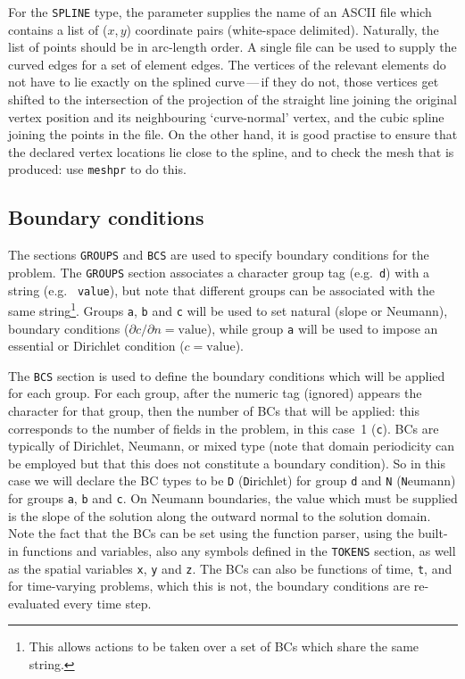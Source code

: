 \documentclass[11pt]{report}
\newcommand{\eg}{e.g.\ } \newcommand{\CC}{\mathrm{c.c.}}
\begin{document}
For the \texttt{SPLINE} type, the parameter supplies the name of an
ASCII file which contains a list of ($x$,\,$y$) coordinate pairs
(white-space delimited). Naturally, the list of points should be in
arc-length order. A single file can be used to supply the curved edges
for a set of element edges. The vertices of the relevant elements do
not have to lie exactly on the splined curve\,---\,if they do not,
those vertices get shifted to the intersection of the projection of
the straight line joining the original vertex position and its
neighbouring `curve-normal' vertex, and the cubic spline joining the
points in the file. On the other hand, it is good practise to ensure
that the declared vertex locations lie close to the spline, and to
check the mesh that is produced: use \texttt{meshpr} to do this.

\subsection{Boundary conditions}

The sections \texttt{GROUPS} and \texttt{BCS} are used to specify
boundary conditions for the problem.  The \texttt{GROUPS} section
associates a character group tag (\eg \verb+d+) with a string (\eg
\verb+value+), but note that different groups can be associated with
the same string\footnote{This allows actions to be taken over a set of
  BCs which share the same string.}.  Groups \verb+a+, \verb+b+ and
\verb+c+ will be used to set natural (\ie slope or Neumann), boundary
conditions ($\partial c/\partial n=\textrm{value}$), while group
\verb+a+ will be used to impose an essential or Dirichlet condition
($c=\textrm{value}$).

The \texttt{BCS} section is used to define the boundary conditions
which will be applied for each group.  For each group, after the
numeric tag (ignored) appears the character for that group, then the
number of BCs that will be applied: this corresponds to the number of
fields in the problem, in this case~1 (\verb+c+).  BCs are typically
of Dirichlet, Neumann, or mixed type (note that domain periodicity can
be employed but that this does not constitute a boundary condition).
So in this case we will declare the BC types to be \verb+D+ ({\texttt
  D}irichlet) for group \verb+d+ and \verb+N+ ({\texttt N}eumann) for
groups \verb+a+, \verb+b+ and \verb+c+.  On Neumann boundaries, the
value which must be supplied is the slope of the solution along the
outward normal to the solution domain.  Note the fact that the BCs can
be set using the function parser, using the built-in functions and
variables, also any symbols defined in the \texttt{TOKENS} section, as
well as the spatial variables \verb+x+, \verb+y+ and \verb+z+.  The
BCs can also be functions of time, \verb+t+, and for time-varying
problems, which this is not, the boundary conditions are re-evaluated
every time step.
\end{document}
